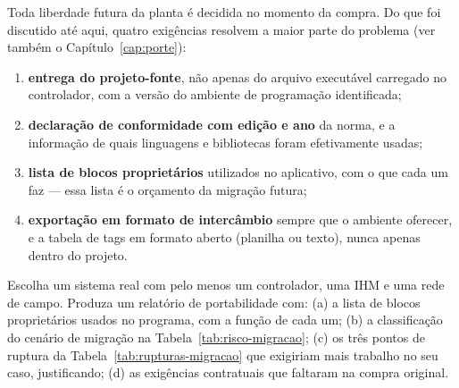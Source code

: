 Toda liberdade futura da planta é decidida no momento da compra. Do que foi discutido até aqui,
quatro exigências resolvem a maior parte do problema (ver também o Capítulo~\ref{cap:porte}):

\begin{enumerate}
  \item \textbf{entrega do projeto-fonte}, não apenas do arquivo executável carregado no controlador,
        com a versão do ambiente de programação identificada;
  \item \textbf{declaração de conformidade com edição e ano} da norma, e a informação de quais
        linguagens e bibliotecas foram efetivamente usadas;
  \item \textbf{lista de blocos proprietários} utilizados no aplicativo, com o que cada um faz ---
        essa lista é o orçamento da migração futura;
  \item \textbf{exportação em formato de intercâmbio} sempre que o ambiente oferecer, e a tabela de
        tags em formato aberto (planilha ou texto), nunca apenas dentro do projeto.
\end{enumerate}

\begin{pratica}
Escolha um sistema real com pelo menos um controlador, uma IHM e uma rede de campo. Produza um
relatório de portabilidade com:
(a) a lista de blocos proprietários usados no programa, com a função de cada um;
(b) a classificação do cenário de migração na Tabela~\ref{tab:risco-migracao};
(c) os três pontos de ruptura da Tabela~\ref{tab:rupturas-migracao} que exigiriam mais trabalho no
seu caso, justificando;
(d) as exigências contratuais que faltaram na compra original.
\end{pratica}

